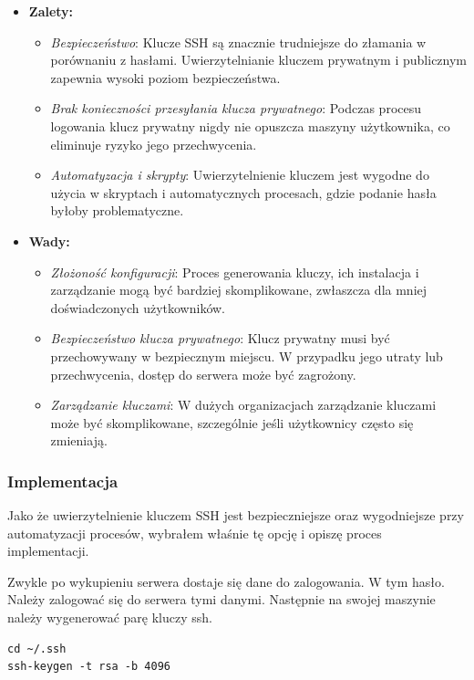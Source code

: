 \documentclass{article}
\begin{document}
\begin{itemize}
    \item \textbf{Zalety:}
    \begin{itemize}
        \item \textit{Bezpieczeństwo}: Klucze SSH są znacznie trudniejsze do złamania w porównaniu z hasłami. Uwierzytelnianie kluczem prywatnym i publicznym zapewnia wysoki poziom bezpieczeństwa.
        \item \textit{Brak konieczności przesyłania klucza prywatnego}: Podczas procesu logowania klucz prywatny nigdy nie opuszcza maszyny użytkownika, co eliminuje ryzyko jego przechwycenia.
        \item \textit{Automatyzacja i skrypty}: Uwierzytelnienie kluczem jest wygodne do użycia w skryptach i automatycznych procesach, gdzie podanie hasła byłoby problematyczne.
    \end{itemize}
    \item \textbf{Wady:}
    \begin{itemize}
        \item \textit{Złożoność konfiguracji}: Proces generowania kluczy, ich instalacja i zarządzanie mogą być bardziej skomplikowane, zwłaszcza dla mniej doświadczonych użytkowników.
        \item \textit{Bezpieczeństwo klucza prywatnego}: Klucz prywatny musi być przechowywany w bezpiecznym miejscu. W przypadku jego utraty lub przechwycenia, dostęp do serwera może być zagrożony.
        \item \textit{Zarządzanie kluczami}: W dużych organizacjach zarządzanie kluczami może być skomplikowane, szczególnie jeśli użytkownicy często się zmieniają.
    \end{itemize}
\end{itemize}

\subsubsection{Implementacja}

Jako że uwierzytelnienie kluczem SSH jest bezpieczniejsze oraz wygodniejsze przy automatyzacji procesów, wybrałem właśnie tę opcję i opiszę proces implementacji.

Zwykle po wykupieniu serwera dostaje się dane do zalogowania. W tym hasło. Należy zalogować się do serwera tymi danymi. Następnie na swojej maszynie należy wygenerować parę kluczy ssh.

\begin{lstlisting}[caption=Wygenerowanie pary kluczy na swojej maszynie]
cd ~/.ssh
ssh-keygen -t rsa -b 4096
\end{lstlisting}
\end{document}
